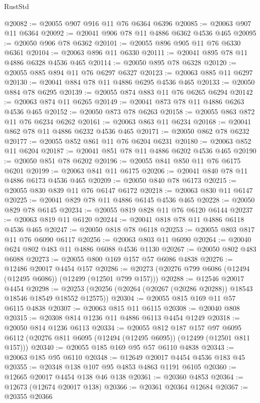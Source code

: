 \begin{lexlean}{RustStd}
\begin{coremodule}
@20082 := @20055 @907 @916 @11 @76 @6364 @6396
@20085 := @20063 @907 @11 @6364
@20092 := @20041 @906 @78 @11 @4886 @6362 @4536 @465
@20095 := @20050 @906 @78 @6362
@20101 := @20055 @896 @905 @11 @76 @6330 @6361
@20104 := @20063 @896 @11 @6330
@20111 := @20041 @895 @78 @11 @4886 @6328 @4536 @465
@20114 := @20050 @895 @78 @6328
@20120 := @20055 @885 @894 @11 @76 @6297 @6327
@20123 := @20063 @885 @11 @6297
@20130 := @20041 @884 @78 @11 @4886 @6295 @4536 @465
@20133 := @20050 @884 @78 @6295
@20139 := @20055 @874 @883 @11 @76 @6265 @6294
@20142 := @20063 @874 @11 @6265
@20149 := @20041 @873 @78 @11 @4886 @6263 @4536 @465
@20152 := @20050 @873 @78 @6263
@20158 := @20055 @863 @872 @11 @76 @6234 @6262
@20161 := @20063 @863 @11 @6234
@20168 := @20041 @862 @78 @11 @4886 @6232 @4536 @465
@20171 := @20050 @862 @78 @6232
@20177 := @20055 @852 @861 @11 @76 @6204 @6231
@20180 := @20063 @852 @11 @6204
@20187 := @20041 @851 @78 @11 @4886 @6202 @4536 @465
@20190 := @20050 @851 @78 @6202
@20196 := @20055 @841 @850 @11 @76 @6175 @6201
@20199 := @20063 @841 @11 @6175
@20206 := @20041 @840 @78 @11 @4886 @6173 @4536 @465
@20209 := @20050 @840 @78 @6173
@20215 := @20055 @830 @839 @11 @76 @6147 @6172
@20218 := @20063 @830 @11 @6147
@20225 := @20041 @829 @78 @11 @4886 @6145 @4536 @465
@20228 := @20050 @829 @78 @6145
@20234 := @20055 @819 @828 @11 @76 @6120 @6144
@20237 := @20063 @819 @11 @6120
@20244 := @20041 @818 @78 @11 @4886 @6118 @4536 @465
@20247 := @20050 @818 @78 @6118
@20253 := @20055 @803 @817 @11 @76 @6090 @6117
@20256 := @20063 @803 @11 @6090
@20264 := @20040 @624 @802 @483 @11 @4886 @6088 @4536 @1130
@20267 := @20050 @802 @483 @6088
@20273 := @20055 @800 @169 @157 @57 @6086 @4838
@20276 := @12486 @20017 @4454 @157
@20286 := @20273 (@20276 @799 @6086 (@12494 (@12495 @6086)) (@12499 (@12501 @799 @157)))
@20288 := @12546 @20017 @4454
@20298 := @20253 (@20256 (@20264 (@20267 (@20286 @20288)) @18543 @18546 @18549 @18552 @12575))
@20304 := @20055 @815 @169 @11 @57 @6115 @4838
@20307 := @20063 @815 @11 @6115
@20308 := @20040 @808
@20315 := @20308 @814 @1236 @11 @4886 @6113 @4454 @1249
@20318 := @20050 @814 @1236 @6113
@20334 := @20055
    @812
    @187
    @157
    @97
    @6095
    @6112
    (@20276 @811 @6095 (@12494 (@12495 @6095)) (@12499 (@12501 @811 @157)))
@20340 := @20055 @185 @169 @95 @57 @6110 @4838
@20343 := @20063 @185 @95 @6110
@20348 := @12649 @20017 @4454 @4536 @183 @45
@20355 := @20348 @138 @107 @95 @4853 @4863 @1191 @6105
@20360 := @12665 @20017 @4454 @138 @46 @138
@20361 := @20360 @4853
@20364 := @12673 (@12674 @20017 @138)
@20366 := @20361 @20364 @12684
@20367 := @20355 @20366

\end{coremodule}
\end{lexlean}
